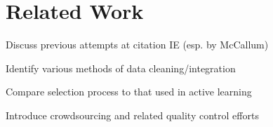 \section{Related Work}
Discuss previous attempts at citation IE (esp. by McCallum) \newline

\noindent Identify various methods of data cleaning/integration \newline

\noindent Compare selection process to that used in active learning \newline

\noindent Introduce crowdsourcing and related quality control efforts
